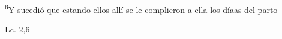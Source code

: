 \documentclass[../../rosario.tex]{subfiles}
\begin{document}
    \textsuperscript{6}Y sucedió que estando ellos allí se le complieron a ella los díaas del parto
    \begin{flushright}
    Lc. 2,6        
    \end{flushright}
\end{document}
